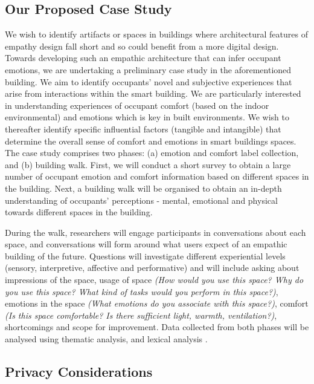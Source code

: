 \documentclass[manuscript, anonymous, review]{acmart}
\begin{document}
\subsection{Our Proposed Case Study} 
We wish to identify artifacts or spaces in buildings where architectural features of empathy design fall short and so could benefit from a more digital design. Towards developing such an empathic architecture that can infer occupant emotions, we are undertaking a preliminary case study in the aforementioned building. We aim to identify occupants' novel and subjective experiences that arise from interactions within the smart building. We are particularly interested in understanding experiences of occupant comfort (based on the indoor environmental) and emotions \cite{alavi2017comfort} which is key in built environments.  We wish to thereafter identify specific influential factors (tangible and intangible) that determine the overall sense of comfort and emotions in smart buildings spaces. The case study comprises two phases: (a) emotion and comfort label collection, and (b) building walk. First, we will conduct a short survey to obtain a large number of occupant emotion and comfort information based on different spaces in the building. Next, a building walk will be organised to obtain an in-depth understanding of occupants' perceptions - mental, emotional and physical towards different spaces in the building.

During the walk, researchers will engage participants in conversations about each space, and conversations will form around what users expect of an empathic building of the future. Questions will investigate different experiential levels (sensory, interpretive, affective and performative) and will include asking about impressions of the space, usage of space \textit{(How would you use this space? Why do you use this space? What kind of tasks would you perform in this space?)}, emotions in the space \textit{(What emotions do you associate with this space?)}, comfort \textit{(Is this space comfortable? Is there sufficient light, warmth, ventilation?)}, shortcomings and scope for improvement. Data collected from both phases will be analysed using thematic analysis, and lexical analysis \cite{braun2006using, xue2020mood}. 

\subsection{Privacy Considerations}
\todo{}
\end{document}
